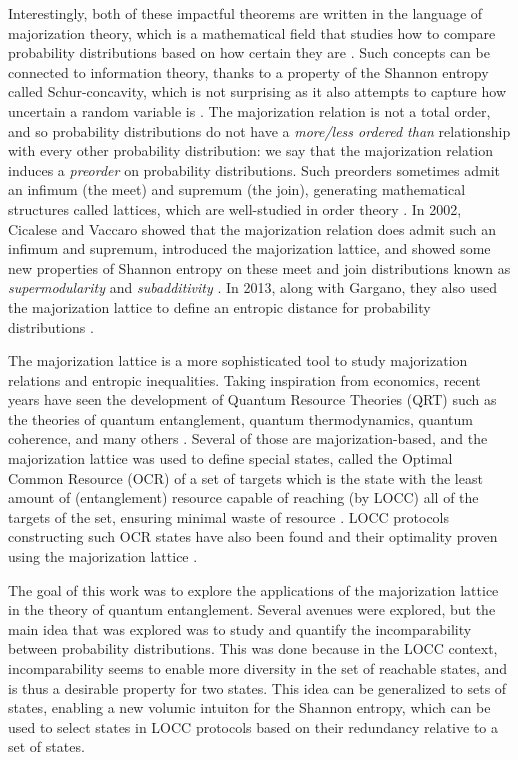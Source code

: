 Interestingly, both of these impactful theorems are written in the language of majorization theory, which is a mathematical field that studies how to compare probability distributions based on how certain they are \cite{marshall_inequalities_2011}. Such concepts can be connected to information theory, thanks to a property of the Shannon entropy called Schur-concavity, which is not surprising as it also attempts to capture how uncertain a random variable is \cite{marshall_inequalities_2011, cover_elements_2006}. The majorization relation is not a total order, and so probability distributions do not have a \textit{more/less ordered than} relationship with every other probability distribution: we say that the majorization relation induces a \textit{preorder} on probability distributions. Such preorders sometimes admit an infimum (the meet) and supremum (the join), generating mathematical structures called lattices, which are well-studied in order theory \cite{davey_introduction_2002}. In 2002, Cicalese and Vaccaro showed that the majorization relation does admit such an infimum and supremum, introduced the majorization lattice, and showed some new properties of Shannon entropy on these meet and join distributions known as \textit{supermodularity} and \textit{subadditivity} \cite{cicalese_supermodularity_2002}. In 2013, along with Gargano, they also used the majorization lattice to define an entropic distance for probability distributions \cite{cicalese_information_2013}.

The majorization lattice is a more sophisticated tool to study majorization relations and entropic inequalities. Taking inspiration from economics, recent years have seen the development of Quantum Resource Theories (QRT) such as the theories of quantum entanglement, quantum thermodynamics, quantum coherence, and many others \cite{chitambar_quantum_2019}. Several of those are majorization-based, and the majorization lattice was used to define special states, called the Optimal Common Resource (OCR) of a set of targets which is the state with the least amount of (entanglement) resource capable of reaching (by LOCC) all of the targets of the set, ensuring minimal waste of resource \cite{bosyk_optimal_2019}. LOCC protocols constructing such OCR states have also been found and their optimality proven using the majorization lattice \cite{deside_probabilistic_2024}.

The goal of this work was to explore the applications of the majorization lattice in the theory of quantum entanglement. Several avenues were explored, but the main idea that was explored was to study and quantify the incomparability between probability distributions. This was done because in the LOCC context, incomparability seems to enable more diversity in the set of reachable states, and is thus a desirable property for two states. This idea can be generalized to sets of states, enabling a new volumic intuiton for the Shannon entropy, which can be used to select states in LOCC protocols based on their redundancy relative to a set of states.

